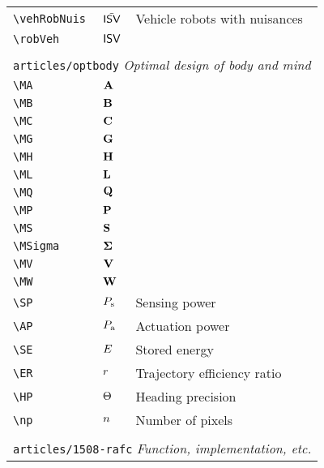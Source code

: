 \begin{longtable}{lll}
 {\color[rgb]{0.5,0.5,0.5}\texttt{\textbackslash vehRobNuis}} & ${\tilde{\mathsf{ISV}}}$ &  Vehicle robots with nuisances\\ 
 {\color[rgb]{0.5,0.5,0.5}\texttt{\textbackslash robVeh}} & $\mathsf{ISV}$ & \\ 
  &  & \\ 
 \multicolumn{3}{l}{{\color[rgb]{0.5,0.5,0.5}\texttt{articles/optbody}} \emph{Optimal design of body and mind}}\\ 
 \hline
{\color[rgb]{0.5,0.5,0.5}\texttt{\textbackslash MA}} & $\mathbf{A}$ & \\ 
 {\color[rgb]{0.5,0.5,0.5}\texttt{\textbackslash MB}} & $\mathbf{B}$ & \\ 
 {\color[rgb]{0.5,0.5,0.5}\texttt{\textbackslash MC}} & $\mathbf{C}$ & \\ 
 {\color[rgb]{0.5,0.5,0.5}\texttt{\textbackslash MG}} & $\mathbf{G}$ & \\ 
 {\color[rgb]{0.5,0.5,0.5}\texttt{\textbackslash MH}} & $\mathbf{H}$ & \\ 
 {\color[rgb]{0.5,0.5,0.5}\texttt{\textbackslash ML}} & $\mathbf{L}$ & \\ 
 {\color[rgb]{0.5,0.5,0.5}\texttt{\textbackslash MQ}} & $\mathbf{Q}$ & \\ 
 {\color[rgb]{0.5,0.5,0.5}\texttt{\textbackslash MP}} & $\mathbf{P}$ & \\ 
 {\color[rgb]{0.5,0.5,0.5}\texttt{\textbackslash MS}} & $\mathbf{S}$ & \\ 
 {\color[rgb]{0.5,0.5,0.5}\texttt{\textbackslash MSigma}} & $\mathbf{\Sigma}$ & \\ 
 {\color[rgb]{0.5,0.5,0.5}\texttt{\textbackslash MV}} & $\mathbf{V}$ & \\ 
 {\color[rgb]{0.5,0.5,0.5}\texttt{\textbackslash MW}} & $\mathbf{W}$ & \\ 
 {\color[rgb]{0.5,0.5,0.5}\texttt{\textbackslash SP}} & $P_{\text{s}}$ &  Sensing power\\ 
 {\color[rgb]{0.5,0.5,0.5}\texttt{\textbackslash AP}} & $P_{\text{a}}$ &  Actuation power\\ 
 {\color[rgb]{0.5,0.5,0.5}\texttt{\textbackslash SE}} & $E$ &  Stored energy\\ 
 {\color[rgb]{0.5,0.5,0.5}\texttt{\textbackslash ER}} & $r$ &  Trajectory efficiency ratio\\ 
 {\color[rgb]{0.5,0.5,0.5}\texttt{\textbackslash HP}} & $\Theta$ &  Heading precision\\ 
 {\color[rgb]{0.5,0.5,0.5}\texttt{\textbackslash np}} & $n$ &  Number of pixels\\ 
  &  & \\ 
 \multicolumn{3}{l}{{\color[rgb]{0.5,0.5,0.5}\texttt{articles/1508-rafc}} \emph{Function, implementation, etc.}}\\ 

\end{longtable}
